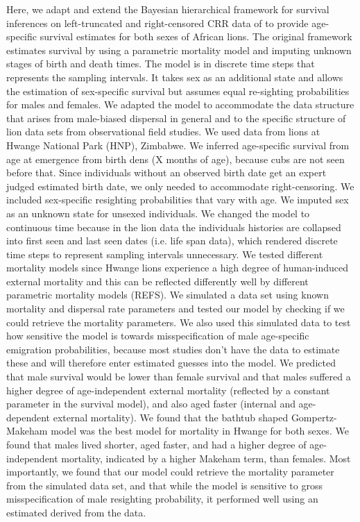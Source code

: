 Here, we adapt and extend the Bayesian hierarchical framework for survival inferences on left-truncated and right-censored CRR data of \citet{Colchero:2012bf} to provide age-specific survival estimates for both sexes of African lions. The original framework estimates survival by using a parametric mortality model and imputing unknown stages of birth and death times. The model is in discrete time steps that represents the sampling intervals. It takes sex as an additional state and allows the estimation of sex-specific survival but assumes equal re-sighting probabilities for males and females. We adapted the model to accommodate the data structure that arises from male-biased dispersal in general and to the specific structure of lion data sets from observational field studies. We used data from lions at Hwange National Park (HNP), Zimbabwe. We inferred age-specific survival from age at emergence from birth dens (X months of age), because cubs are not seen before that. Since individuals without an observed birth date get an expert judged estimated birth date, we only needed to accommodate right-censoring. We included sex-specific resighting probabilities that vary with age. We imputed sex as an unknown state for unsexed individuals. We changed the model to continuous time because in the lion data the individuals histories are collapsed into first seen and last seen dates (i.e. life span data), which rendered discrete time steps to represent sampling intervals unnecessary. We tested different mortality models since Hwange lions experience a high degree of human-induced external mortality and this can be reflected differently well by different parametric mortality models (REFS). We simulated a data set using known mortality and dispersal rate parameters and tested our model by checking if we could retrieve the mortality parameters.  We also used this simulated data to test how sensitive the model is towards misspecification of male age-specific emigration probabilities, because most studies don't have the data to estimate these and will therefore enter estimated guesses into the model. We predicted that male survival would be lower than female survival and that males suffered a higher degree of age-independent external mortality (reflected by a constant parameter in the survival model), and also aged faster (internal and age-dependent external mortality). We found that the bathtub shaped Gompertz-Makeham model was the best model for mortality in Hwange for both sexes. We found that males lived shorter, aged faster, and had a higher degree of age-independent mortality, indicated by a higher Makeham term, than females. Most importantly, we found that our model could retrieve the mortality parameter from the simulated data set, and that while the model is sensitive to gross misspecification of male resighting probability, it performed well using an estimated derived from the data. 

